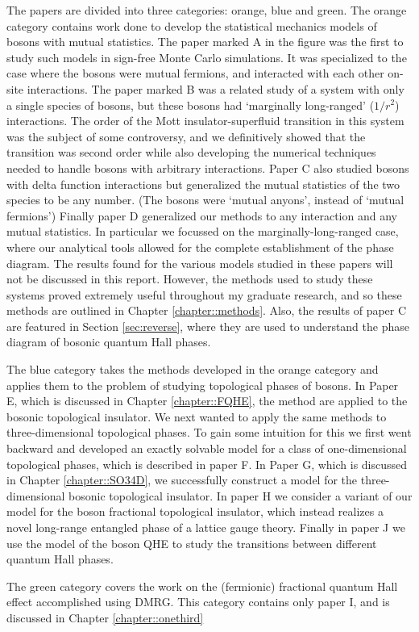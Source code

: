 The papers are divided into three categories: orange, blue and green. The orange category contains work done to develop the statistical mechanics models of bosons with mutual statistics. The paper marked A in the figure was the first to study such models in sign-free Monte Carlo simulations. It was specialized to the case where the bosons were mutual fermions, and interacted with each other on-site interactions. 
The paper marked B was a related study of a system with only a single species of bosons, but these bosons had `marginally long-ranged' ($1/r^2$) interactions. The order of the Mott insulator-superfluid transition in this system was the subject of some controversy, and we definitively showed that the transition was second order while also developing the numerical techniques needed to handle bosons with arbitrary interactions. 
Paper C also studied bosons with delta function interactions but generalized the mutual statistics of the two species to be any number. (The bosons were `mutual anyons', instead of `mutual fermions') 
Finally paper D generalized our methods to any interaction and any mutual statistics. In particular we focussed on the marginally-long-ranged case, where our analytical tools allowed for the complete establishment of the phase diagram. The results found for the various models studied in these papers will not be discussed in this report. However, the methods used to study these systems proved extremely useful throughout my graduate research, and so these methods are outlined in Chapter \ref{chapter::methods}. Also, the results of paper C are featured in Section \ref{sec:reverse}, where they are used to understand the phase diagram of bosonic quantum Hall phases.

The blue category takes the methods developed in the orange category and applies them to the problem of studying topological phases of bosons. In Paper E, which is discussed in Chapter \ref{chapter::FQHE}, the method are applied to the bosonic topological insulator. We next wanted to apply the same methods to three-dimensional topological phases. To gain some intuition for this we first went backward and developed an exactly solvable model for a class of one-dimensional topological phases, which is described in paper F. In Paper G, which is discussed in Chapter \ref{chapter::SO34D}, we successfully construct a model for the three-dimensional bosonic topological insulator. In paper H we consider a variant of our model for the boson fractional topological insulator, which instead realizes a novel long-range entangled phase of a lattice gauge theory. Finally in paper J we use the model of the boson QHE to study the transitions between different quantum Hall phases.

The green category covers the work on the (fermionic) fractional quantum Hall effect accomplished using DMRG. This category contains only paper I, and is discussed in Chapter \ref{chapter::onethird}
